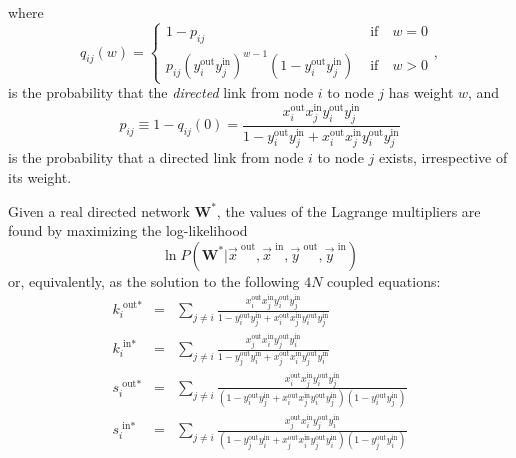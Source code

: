 \documentclass[aps,twocolumn,superscriptaddress]{revtex4-1}
\begin{document}
where 
\begin{equation}
q_{ij}(w)=\left\{\begin{array}{ll}1-p_{ij}&\textrm{ if}\quad w=0\\
p_{ij}\left(y^\textrm{out}_i y^\textrm{in}_j\right)^{w-1}(1-y^\textrm{out}_i y^\textrm{in}_j)&\textrm{ if}\quad w>0\end{array}\right.,\nonumber
\end{equation}
is the probability that the \emph{directed} link from node $i$ to node $j$ has weight $w$, and
\begin{equation}
p_{ij}\equiv1-q_{ij}(0)=\dfrac{x^\textrm{out}_i x^\textrm{in}_j y^\textrm{out}_i y^\textrm{in}_j}{1 - y^\textrm{out}_i y^\textrm{in}_j + x^\textrm{out}_i x^\textrm{in}_j y^\textrm{out}_i y^\textrm{in}_j}
\end{equation}
is the probability that a directed link from node $i$ to node $j$ exists, irrespective of its weight.

Given a real directed network $\bm{W}^\ast$, the values of the Lagrange multipliers are found by maximizing the log-likelihood
\begin{equation}
\ln P(\bm{W^{\ast}} | \vec{x}^\textrm{ out},\vec{x}^\textrm { in},\vec{y}^\textrm{ out},\vec{y}^\textrm{ in})
\end{equation}
or, equivalently, as the solution to the following $4N$ coupled equations:
\begin{eqnarray}
k^{\textrm{ out}\ast}_i&=&\sum_{j\ne i}\frac{x^\textrm{out}_i x^\textrm{in}_j y^\textrm{out}_i y^\textrm{in}_j}{1 - y^\textrm{out}_i y^\textrm{in}_j + x^\textrm{out}_i x^\textrm{in}_j y^\textrm{out}_i y^\textrm{in}_j}\nonumber\\
k^{\textrm{ in}\ast}_i&=&\sum_{j\ne i}\frac{x^\textrm{out}_j x^\textrm{in}_i y^\textrm{out}_j y^\textrm{in}_i}{1 - y^\textrm{out}_j y^\textrm{in}_i + x^\textrm{out}_j x^\textrm{in}_i y^\textrm{out}_j y^\textrm{in}_i}\nonumber\\
s_i^{\textrm{ out}\ast}&=&\sum_{j\ne i}\frac{x^\textrm{out}_i x^\textrm{in}_j y^\textrm{out}_i y^\textrm{in}_j}{(1 - y^\textrm{out}_i y^\textrm{in}_j + x^\textrm{out}_i x^\textrm{in}_j y^\textrm{out}_i y^\textrm{in}_j)(1-y^\textrm{out}_i y^\textrm{in}_j)}
\nonumber\\
s_i^{\textrm{ in}\ast}&=&\sum_{j\ne i}\frac{x^\textrm{out}_j x^\textrm{in}_i y^\textrm{out}_j y^\textrm{in}_i}{(1 - y^\textrm{out}_j y^\textrm{in}_i + x^\textrm{out}_j x^\textrm{in}_i y^\textrm{out}_j y^\textrm{in}_i)(1-y^\textrm{out}_j y^\textrm{in}_i)}\nonumber
\end{eqnarray}
\end{document}
